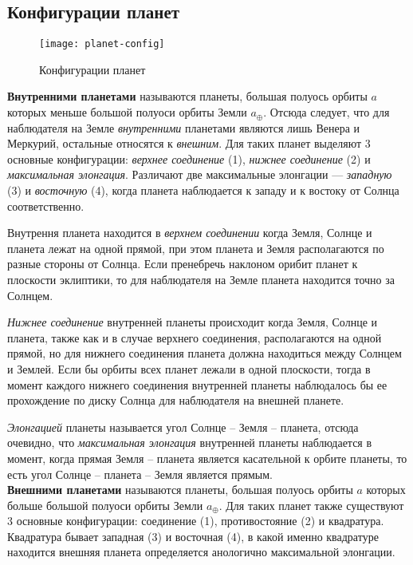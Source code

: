 \subsection{Конфигурации планет}

\begin{figure}[h!]
\centering
\texttt{[image: planet-config]}
\caption{Конфигурации планет}
\end{figure}

{\bfseries Внутренними планетами} называются планеты, 
большая полуось орбиты $a$ которых меньше большой 
полуоси орбиты Земли $a_\oplus$. Отсюда следует, что 
для наблюдателя на Земле {\itshape внутренними} 
планетами являются лишь Венера и Меркурий, остальные 
относятся к {\itshape внешним}. Для таких планет 
выделяют 3 основные конфигурации: {\itshape верхнее 
соединение} (1), {\itshape нижнее соединение} (2) и 
{\itshape максимальная элонгация}. Различают две 
максимальные элонгации --- {\itshape западную} (3) и 
{\itshape восточную} (4), когда планета наблюдается к 
западу и к востоку от Солнца соответственно.

Внутрення планета находится в {\itshape верхнем 
соединении} когда Земля, Солнце и планета лежат на 
одной прямой, при этом планета и Земля располагаются 
по разные стороны от Солнца. Если пренебречь наклоном 
орибит планет к плоскости эклиптики, то для 
наблюдателя на Земле планета находится точно за Солнцем.

{\itshape Нижнее соединение} внутренней планеты 
происходит когда Земля, Солнце и планета, также как и 
в случае верхнего соединения, располагаются на одной 
прямой, но для нижнего соединения планета должна 
находиться между Солнцем и Землей. Если бы орбиты всех 
планет лежали в одной плоскости, тогда в момент каждого 
нижнего соединения внутренней планеты наблюдалось бы 
ее прохождение по диску Солнца для наблюдателя на 
внешней планете.

{\itshape Элонгацией} планеты называется угол Солнце 
-- Земля -- планета, отсюда очевидно, что {\itshape 
максимальная элонгация} внутренней планеты наблюдается 
в момент, когда прямая Земля -- планета является 
касательной к орбите планеты, то есть угол Солнце -- 
планета -- Земля является прямым.\\

{\bfseries Внешними планетами} называются планеты, 
большая полуось орбиты $a$ которых больше большой 
полуоси орбиты Земли $a_\oplus$. Для таких планет 
также существуют 3 основные конфигурации: соединение 
(1), противостояние (2) и квадратура. Квадратура 
бывает западная (3) и восточная (4), в какой именно 
квадратуре находится внешняя планета определяется 
анологично максимальной элонгации.


